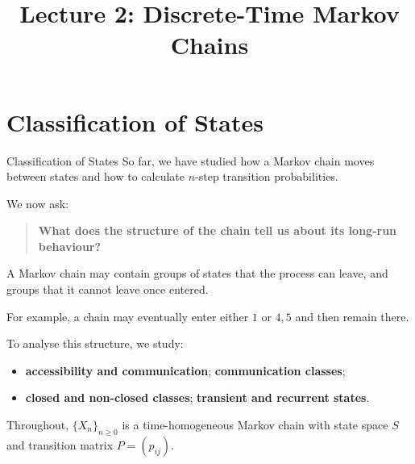 \documentclass[
  ignorenonframetext,
  aspectratio=169,
]{beamer}
\title{\texorpdfstring{Lecture 2: Discrete-Time Markov
Chains}{Lecture 2: Discrete-Time Markov Chains}}
\author{}
\date{}
\providecommand{\tightlist}{%
  \setlength{\itemsep}{0pt}\setlength{\parskip}{0pt}}
\begin{document}
\frame{\titlepage}


\section{Classification of States}\label{classification-of-states}

\begin{frame}{Classification of States}
\protect{}\label{classification-of-states-1}
So far, we have studied how a Markov chain moves between states and how
to calculate \(n\)-step transition probabilities.

We now ask:

\begin{quote}
\textbf{What does the structure of the chain tell us about its long-run
behaviour?}
\end{quote}

A Markov chain may contain groups of states that the process can leave,
and groups that it cannot leave once entered.

For example, a chain may eventually enter either \({1}\) or \({4,5}\)
and then remain there.

To analyse this structure, we study:

\begin{itemize}
\tightlist
\item
  \textbf{accessibility and communication}; \textbf{communication
  classes};
\item
  \textbf{closed and non-closed classes}; \textbf{transient and
  recurrent states}.
\end{itemize}

Throughout, \(\{X_n\}_{n\geq 0}\) is a time-homogeneous Markov chain
with state space \(S\) and transition matrix \(P=(p_{ij})\).
\end{frame}
\end{document}
